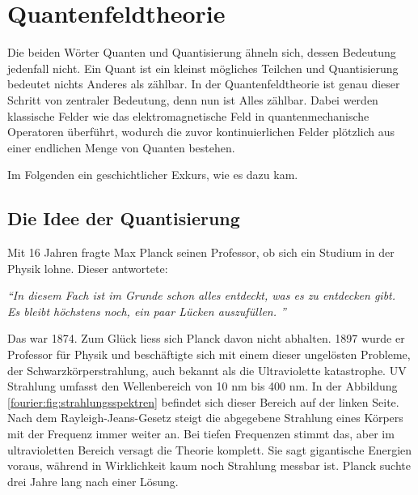 %
%
%
%
\section{Quantenfeldtheorie\label{fourier:section:quantenfeldtheorie}}
Die beiden Wörter Quanten und Quantisierung ähneln sich, dessen Bedeutung jedenfall nicht. 
Ein Quant ist ein kleinst mögliches Teilchen und Quantisierung bedeutet nichts Anderes als zählbar. 
In der Quantenfeldtheorie ist genau dieser Schritt von zentraler Bedeutung, denn nun ist Alles zählbar. 
Dabei werden klassische Felder wie das elektromagnetische Feld in quantenmechanische Operatoren überführt, wodurch die zuvor kontinuierlichen Felder plötzlich aus einer endlichen Menge von Quanten bestehen.

Im Folgenden ein geschichtlicher Exkurs, wie es dazu kam. 



\subsection{Die Idee der Quantisierung\label{fourier:subsection:DieIdeeDerQuantisierung}}
	Mit 16 Jahren fragte Max Planck seinen Professor, ob sich ein Studium in der Physik lohne. 
	Dieser antwortete:
	
	\begin{center}
		\textit{``{}In diesem Fach ist im Grunde schon alles entdeckt, was es zu entdecken gibt.\\
			Es bleibt höchstens noch, ein paar Lücken auszufüllen. ''}
	\end{center}
	
	Das war 1874. 
	Zum Glück liess sich Planck davon nicht abhalten.
	1897 wurde er Professor für Physik und beschäftigte sich mit einem dieser ungelösten Probleme, der Schwarzkörperstrahlung, auch bekannt als die Ultraviolette katastrophe. 
	UV Strahlung umfasst den Wellenbereich von 10 nm bis 400 nm. 
	In der Abbildung \ref{fourier:fig:strahlungsspektren} befindet sich dieser Bereich auf der linken Seite.
	Nach dem Rayleigh-Jeans-Gesetz steigt die abgegebene Strahlung eines Körpers mit der Frequenz immer weiter an. 
	Bei tiefen Frequenzen stimmt das, aber im ultravioletten Bereich versagt die Theorie komplett. 
	Sie sagt gigantische Energien voraus, während in Wirklichkeit kaum noch Strahlung messbar ist.
	Planck suchte drei Jahre lang nach einer Lösung. 
	

